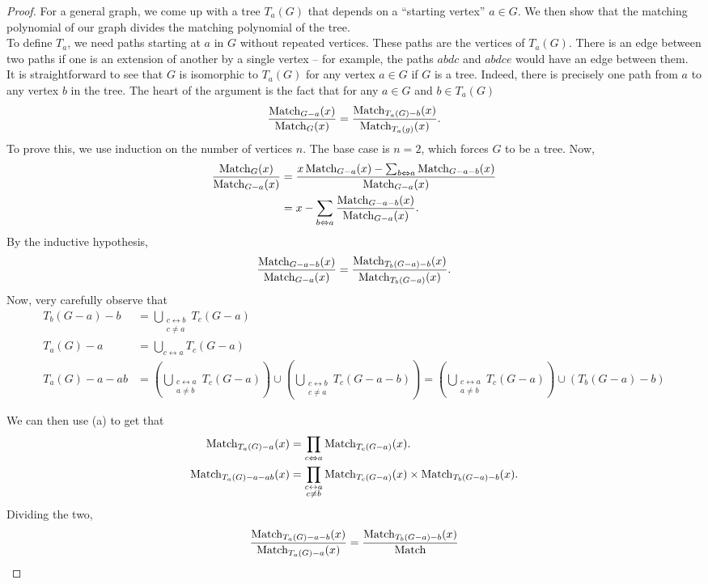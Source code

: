 \begin{proof}
		For a general graph, we come up with a tree $T_a(G)$ that depends on a ``starting vertex'' $a \in G$. We then show that the matching polynomial of our graph divides the matching polynomial of the tree.\\
		To define $T_a$, we need paths starting at $a$ in $G$ without repeated vertices. These paths are the vertices of $T_a(G)$. There is an edge between two paths if one is an extension of another by a single vertex -- for example, the paths $abdc$ and $abdce$ would have an edge between them.\\
		It is straightforward to see that $G$ is isomorphic to $T_a(G)$ for any vertex $a \in G$ if $G$ is a tree. Indeed, there is precisely one path from $a$ to any vertex $b$ in the tree.
		The heart of the argument is the fact that for any $a\in G$ and $b \in T_a(G)$
		\[ \frac{\operatorname{Match}_{G - a}(x)}{\operatorname{Match}_G(x)} = \frac{\operatorname{Match}_{T_a(G)- b}(x)}{\operatorname{Match}_{T_a(g)}(x)}. \]
		To prove this, we use induction on the number of vertices $n$. The base case is $n=2$, which forces $G$ to be a tree. Now,
		\begin{align*}
			\frac{\operatorname{Match}_G(x)}{\operatorname{Match}_{G-a}(x)} &= \frac{x\operatorname{Match}_{G-a}(x) - \sum_{b\Leftrightarrow a} \operatorname{Match}_{G-a-b}(x)}{\operatorname{Match}_{G-a}(x)} \\
				&= x - \sum_{b \Leftrightarrow a} \frac{\operatorname{Match}_{G-a-b}(x)}{\operatorname{Match}_{G-a}(x)}.
		\end{align*}
		By the inductive hypothesis,
		\[ \frac{\operatorname{Match}_{G-a-b}(x)}{\operatorname{Match}_{G-a}(x)} =  \frac{\operatorname{Match}_{T_b(G-a)-b}(x)}{\operatorname{Match}_{T_b(G-a)}(x)}. \]
		Now, very carefully observe that
		\begin{align*}
			T_b(G-a)-b &= \bigcup_{\substack{c \leftrightarrow b \\ c \ne a}} T_c(G-a) \\
			T_a(G)-a &= \bigcup_{c\leftrightarrow a} T_c(G-a) \\
			T_a(G)-a-ab &= \left(\bigcup_{\substack{c\leftrightarrow a \\ a \ne b}} T_c(G-a)\right) \cup \left(\bigcup_{\substack{c\leftrightarrow b \\ c \ne a}} T_c(G-a-b)\right) = \left(\bigcup_{\substack{c\leftrightarrow a \\ a \ne b}} T_c(G-a)\right) \cup \left(T_b(G-a)-b\right)
		\end{align*}

		We can then use (a) to get that
		\begin{align*}
			\operatorname{Match}_{T_a(G)-a}(x) &= \prod_{c\Leftrightarrow a} \operatorname{Match}_{T_c(G-a)}(x). \\
			\operatorname{Match}_{T_a(G)-a-ab}(x) &= \prod_{\substack{c \leftrightarrow a \\ c \ne b}} \operatorname{Match}_{T_c(G-a)}(x) \times \operatorname{Match}_{T_b(G-a)-b}(x).		
		\end{align*}
		Dividing the two,
		\[ \frac{\operatorname{Match}_{T_a(G)-a-b}(x)}{\operatorname{Match}_{T_a(G)-a}(x)} = \frac{\operatorname{Match}_{T_b(G-a)-b}(x)}{\operatorname{Match}} \]
	\end{proof}

